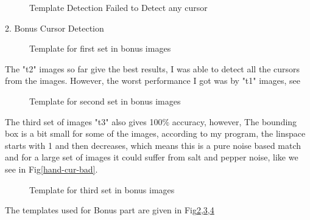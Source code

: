 \documentclass[12pt]{article}
\newenvironment{QandA}
{
	\begin{enumerate}[label=\normalfont\arabic*.,leftmargin=2em,rightmargin=2em]\normalfont
	}
	{
	\end{enumerate}
}
\newenvironment{answered}{\setlength{\parindent}{1em}\par\normalfont}{}
\begin{document}
\begin{QandA}
\begin{answered}
\begin{figure}
  			\caption{Template Detection Failed to Detect any cursor}
  		\label{why-basic-why}
\end{figure}
2. Bonus Cursor Detection
\begin{figure}
		\centering
  			\caption{Template for first set in bonus images}
  		\label{bonus1-template}
\end{figure}
The "t2" images so far give the best results, I was able to detect all the cursors from the images. However, the worst performance I got was by "t1" images, see
\begin{figure}
		\centering
  			\caption{Template for second set in bonus images}
  		\label{bonus2-template}
\end{figure}
The third set of images "t3" also gives 100$\%$ accuracy, however, The bounding box is a bit small for some of the images, according to my program, the linspace starts with 1 and then decreases, which means this is a pure noise based match and for a large set of images it could suffer from salt and pepper noise, like we see in Fig{\ref{hand-cur-bad}}.
\begin{figure}
		\centering
  			\caption{Template for third set in bonus images}
  		\label{bonus3-template}
\end{figure}
The templates used for Bonus part are given in Fig\ref{bonus1-template},\ref{bonus2-template},\ref{bonus3-template}
\begin{figure}
		\centering

\end{figure}
\end{answered}
\end{QandA}
\end{document}
